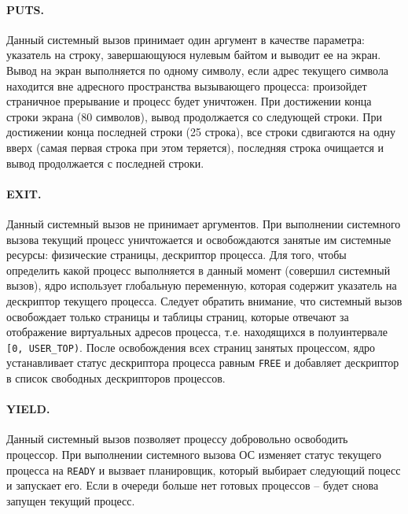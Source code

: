 \paragraph{PUTS.} Данный системный вызов принимает один аргумент в качестве параметра: указатель на
строку, завершающуюся нулевым байтом и выводит ее на экран. Вывод на экран выполняется по одному
символу, если адрес текущего символа находится вне адресного пространства вызывающего процесса:
произойдет страничное прерывание и процесс будет уничтожен. При достижении конца строки экрана (80 символов),
вывод продолжается со следующей строки. При достижении конца последней строки (25 строка), все строки
сдвигаются на одну вверх (самая первая строка при этом теряется), последняя строка очищается и вывод
продолжается с последней строки.

\paragraph{EXIT.} Данный системный вызов не принимает аргументов. При выполнении системного
вызова текущий процесс уничтожается и освобождаются занятые им системные ресурсы: физические страницы,
дескриптор процесса. Для того, чтобы определить какой процесс выполняется в данный момент (совершил
системный вызов), ядро использует глобальную переменную, которая содержит указатель на дескриптор
текущего процесса. Следует обратить внимание, что системный вызов освобождает только страницы и таблицы
страниц, которые отвечают за отображение виртуальных адресов процесса, т.е. находящихся
в полуинтервале \texttt{[0, USER\_TOP)}. После освобождения всех страниц занятых процессом, ядро устанавливает
статус дескриптора процесса равным \texttt{FREE} и добавляет дескриптор в список свободных
дескрипторов процессов.

\paragraph{YIELD.} Данный системный вызов позволяет процессу добровольно освободить процессор. При
выполнении системного вызова ОС изменяет статус текущего процесса на \texttt{READY} и вызвает
планировщик, который выбирает следующий поцесс и запускает его. Если в очереди больше нет готовых
процессов -- будет снова запущен текущий процесс.

